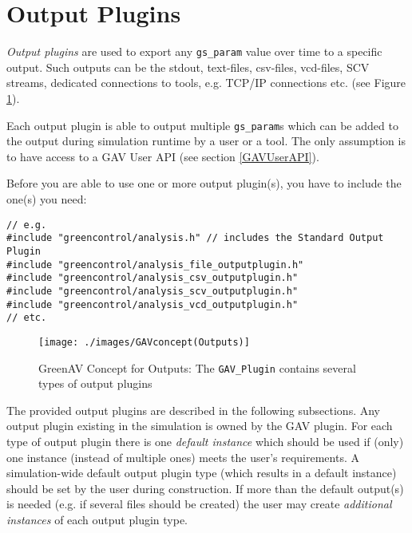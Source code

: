 
\section{Output Plugins}
\label{GAVOutputPlugins}

{\em Output plugins} are used to export any \lstinline|gs_param| value over time to a specific output. Such outputs can be the stdout, text-files, csv-files, vcd-files, SCV streams, dedicated connections to tools, e.g. TCP/IP connections etc. (see Figure \ref{fig:GAVConceptOutputs}).

Each output plugin is able to output multiple \lstinline|gs_param|s which can be added to the output during simulation runtime by a user or a tool. The only assumption is to have access to a GAV User API (see section \ref{GAVUserAPI}).

Before you are able to use one or more output plugin(s), you have to include the one(s) you need:

\noindent
\begin{minipage}{\textwidth}
\begin{lstlisting}[caption={Include for output plugin}, label=lst:GAVIncludeOutputPlugin]
// e.g.
#include "greencontrol/analysis.h" // includes the Standard Output Plugin
#include "greencontrol/analysis_file_outputplugin.h"
#include "greencontrol/analysis_csv_outputplugin.h"
#include "greencontrol/analysis_scv_outputplugin.h"
#include "greencontrol/analysis_vcd_outputplugin.h"
// etc.
\end{lstlisting}
\end{minipage}

\begin{figure}[htbp]
	\centerline{
		\texttt{[image: ./images/GAVconcept(Outputs)]}}
	\caption{GreenAV Concept for Outputs: The \lstinline|GAV_Plugin| contains several types of output plugins}
	\label{fig:GAVConceptOutputs}
\end{figure}


The provided output plugins are described in the following subsections. Any output plugin existing in the simulation is owned by the GAV plugin. For each type of output plugin there is one {\em default instance} which should be used if (only) one instance (instead of multiple ones) meets the user's requirements. A simulation-wide default output plugin type (which results in a default instance) should be set by the user during construction. If more than the default output(s) is needed (e.g. if several files should be created) the user may create {\em additional instances} of each output plugin type.

